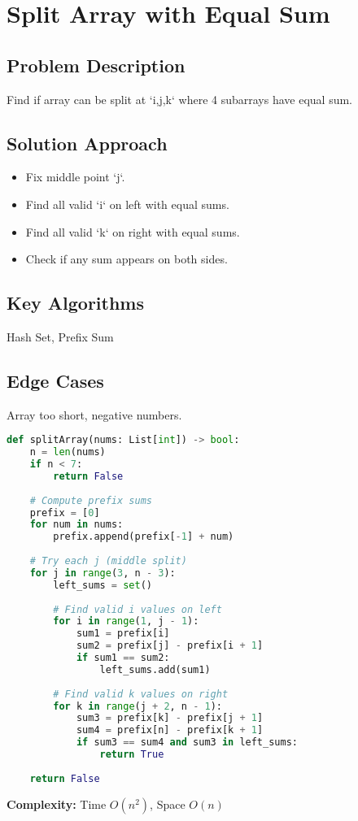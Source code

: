 \documentclass[10pt, a4paper]{article}
\begin{document}
\section{Split Array with Equal Sum}
\subsection*{Problem Description}
Find if array can be split at `i,j,k` where 4 subarrays have equal sum.

\subsection*{Solution Approach}
\begin{itemize}
    \item Fix middle point `j`.
    \item Find all valid `i` on left with equal sums.
    \item Find all valid `k` on right with equal sums.
    \item Check if any sum appears on both sides.
\end{itemize}

\subsection*{Key Algorithms}
Hash Set, Prefix Sum

\subsection*{Edge Cases}
Array too short, negative numbers.

\begin{lstlisting}[language=Python]
def splitArray(nums: List[int]) -> bool:
    n = len(nums)
    if n < 7:
        return False
    
    # Compute prefix sums
    prefix = [0]
    for num in nums:
        prefix.append(prefix[-1] + num)
    
    # Try each j (middle split)
    for j in range(3, n - 3):
        left_sums = set()
        
        # Find valid i values on left
        for i in range(1, j - 1):
            sum1 = prefix[i]
            sum2 = prefix[j] - prefix[i + 1]
            if sum1 == sum2:
                left_sums.add(sum1)
        
        # Find valid k values on right
        for k in range(j + 2, n - 1):
            sum3 = prefix[k] - prefix[j + 1]
            sum4 = prefix[n] - prefix[k + 1]
            if sum3 == sum4 and sum3 in left_sums:
                return True
    
    return False
\end{lstlisting}
\textbf{Complexity:} Time $O(n^2)$, Space $O(n)$
\end{document}
